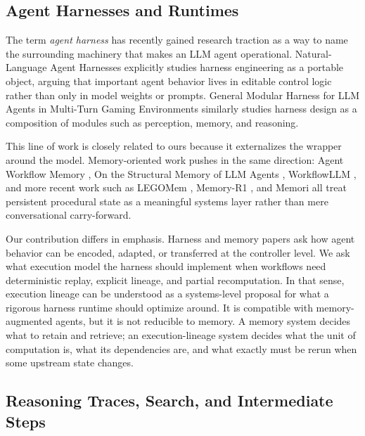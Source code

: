 \documentclass{article}
\begin{document}
\subsection{Agent Harnesses and Runtimes}

The term \emph{agent harness} has recently gained research traction as a way to name the surrounding machinery that makes an LLM agent operational. Natural-Language Agent Harnesses \cite{pan2026nlah} explicitly studies harness engineering as a portable object, arguing that important agent behavior lives in editable control logic rather than only in model weights or prompts. General Modular Harness for LLM Agents in Multi-Turn Gaming Environments \cite{zhang2025harness} similarly studies harness design as a composition of modules such as perception, memory, and reasoning.

This line of work is closely related to ours because it externalizes the wrapper around the model. Memory-oriented work pushes in the same direction: Agent Workflow Memory \cite{wang2024awm}, On the Structural Memory of LLM Agents \cite{zeng2024structuralmemory}, WorkflowLLM \cite{fan2024workflowllm}, and more recent work such as LEGOMem \cite{han2025legomem}, Memory-R1 \cite{yan2025memoryr1}, and Memori \cite{borro2026memori} all treat persistent procedural state as a meaningful systems layer rather than mere conversational carry-forward.

Our contribution differs in emphasis. Harness and memory papers ask how agent behavior can be encoded, adapted, or transferred at the controller level. We ask what execution model the harness should implement when workflows need deterministic replay, explicit lineage, and partial recomputation. In that sense, execution lineage can be understood as a systems-level proposal for what a rigorous harness runtime should optimize around. It is compatible with memory-augmented agents, but it is not reducible to memory. A memory system decides what to retain and retrieve; an execution-lineage system decides what the unit of computation is, what its dependencies are, and what exactly must be rerun when some upstream state changes.

\subsection{Reasoning Traces, Search, and Intermediate Steps}
\end{document}
